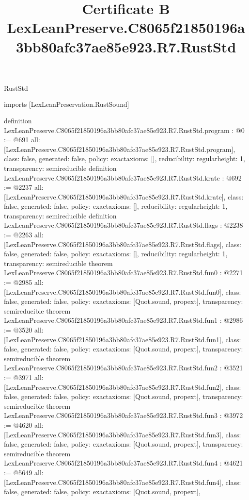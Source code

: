 \begin{lexlean}{RustStd}
\title{Certificate B LexLeanPreserve.C8065f21850196a3bb80afc37ae85e923.R7.RustStd}
\begin{coremodule}
imports [LexLeanPreservation.RustSound]

definition LexLeanPreserve.C8065f21850196a3bb80afc37ae85e923.R7.RustStd.program : @0 := @691 {
  all: [LexLeanPreserve.C8065f21850196a3bb80afc37ae85e923.R7.RustStd.program],
  class: false,
  generated: false,
  policy: exact{axioms: []},
  reducibility: regular{height: 1},
  transparency: semireducible
}
definition LexLeanPreserve.C8065f21850196a3bb80afc37ae85e923.R7.RustStd.krate : @692 := @2237 {
  all: [LexLeanPreserve.C8065f21850196a3bb80afc37ae85e923.R7.RustStd.krate],
  class: false,
  generated: false,
  policy: exact{axioms: []},
  reducibility: regular{height: 1},
  transparency: semireducible
}
definition LexLeanPreserve.C8065f21850196a3bb80afc37ae85e923.R7.RustStd.flags : @2238 := @2263 {
  all: [LexLeanPreserve.C8065f21850196a3bb80afc37ae85e923.R7.RustStd.flags],
  class: false,
  generated: false,
  policy: exact{axioms: []},
  reducibility: regular{height: 1},
  transparency: semireducible
}
theorem LexLeanPreserve.C8065f21850196a3bb80afc37ae85e923.R7.RustStd.fun0 : @2271 := @2985 {
  all: [LexLeanPreserve.C8065f21850196a3bb80afc37ae85e923.R7.RustStd.fun0],
  class: false,
  generated: false,
  policy: exact{axioms: [Quot.sound, propext]},
  transparency: semireducible
}
theorem LexLeanPreserve.C8065f21850196a3bb80afc37ae85e923.R7.RustStd.fun1 : @2986 := @3520 {
  all: [LexLeanPreserve.C8065f21850196a3bb80afc37ae85e923.R7.RustStd.fun1],
  class: false,
  generated: false,
  policy: exact{axioms: [Quot.sound, propext]},
  transparency: semireducible
}
theorem LexLeanPreserve.C8065f21850196a3bb80afc37ae85e923.R7.RustStd.fun2 : @3521 := @3971 {
  all: [LexLeanPreserve.C8065f21850196a3bb80afc37ae85e923.R7.RustStd.fun2],
  class: false,
  generated: false,
  policy: exact{axioms: [Quot.sound, propext]},
  transparency: semireducible
}
theorem LexLeanPreserve.C8065f21850196a3bb80afc37ae85e923.R7.RustStd.fun3 : @3972 := @4620 {
  all: [LexLeanPreserve.C8065f21850196a3bb80afc37ae85e923.R7.RustStd.fun3],
  class: false,
  generated: false,
  policy: exact{axioms: [Quot.sound, propext]},
  transparency: semireducible
}
theorem LexLeanPreserve.C8065f21850196a3bb80afc37ae85e923.R7.RustStd.fun4 : @4621 := @5649 {
  all: [LexLeanPreserve.C8065f21850196a3bb80afc37ae85e923.R7.RustStd.fun4],
  class: false,
  generated: false,
  policy: exact{axioms: [Quot.sound, propext]},
}
\end{coremodule}
\end{lexlean}
